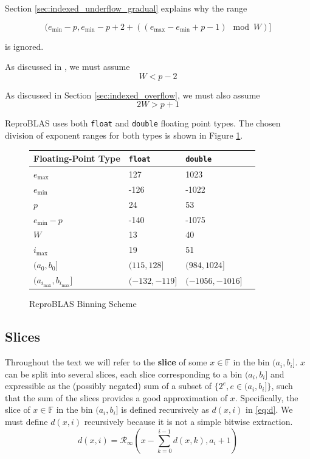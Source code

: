 \documentclass[12pt]{article}
\providecommand{\F}{\ensuremath{\mathbb{F}}}
\providecommand{\min}{\ensuremath{\text{min}}}
\providecommand{\max}{\ensuremath{\text{max}}}
\providecommand{\roundtonearestinfty}{\ensuremath{\mathcal{R}_\text{$\infty$}}}
\theoremstyle{definition}
\numberwithin{equation}{section}
\numberwithin{figure}{section}
\begin{document}
    Section \ref{sec:indexed_underflow_gradual} explains why the range

    \begin{equation*}
    (e_{\min} - p, e_{\min} - p + 2 + ((e_{\max} - e_{\min} + p - 1) \mod W)]
    \end{equation*}

    is ignored.

    As discussed in \cite{repsum}, we must assume
    \begin{equation}
      W < p - 2
      \label{eq:wupper}
    \end{equation}

    As discussed in Section \ref{sec:indexed_overflow}, we must also assume
    \begin{equation}
      2 W > p + 1
      \label{eq:wlower}
    \end{equation}

    ReproBLAS uses both \texttt{float} and \texttt{double} floating point types. The chosen division of exponent ranges for both types is shown in Figure \ref{fig:bins}.
    \begin{figure}[H] \centering\begin{tabular}{ | l | l | l | p{5cm} |} \hline Floating-Point Type & \texttt{float} & \texttt{double}\\ \hline $e_{\max}$ & 127 & 1023\\ \hline $e_{\min}$ &  -126 & -1022 \\ \hline $p$ & 24 & 53 \\ \hline $e_{\min} - p$ & -140 & -1075 \\ \hline $W$ & 13 & 40 \\ \hline $i_{\max}$ & 19 & 51 \\ \hline $(a_0, b_0]$ & $(115, 128]$ & $(984, 1024]$\\ \hline $(a_{i_{\max}}, b_{i_{\max}}]$ & $(-132, -119]$ & $(-1056, -1016]$ \\ \hline\end{tabular} \caption{ReproBLAS Binning Scheme}\label{fig:bins}\end{figure}

  \subsection{Slices}
    \label{sec:binning_slices}
    Throughout the text we will refer to the \textbf{slice} of some $x \in \F$ in the bin $(a_i, b_i]$. $x$ can be split into several slices, each slice corresponding to a bin $(a_i, b_i]$ and expressible as the (possibly negated) sum of a subset of $\{2^e, e \in (a_i, b_i]\}$, such that the sum of the slices provides a good approximation of $x$. Specifically, the slice of $x \in \F$ in the bin $(a_i, b_i]$ is defined recursively as $d(x, i)$ in \eqref{eq:d}. We must define $d(x, i)$ recursively because it is not a simple bitwise extraction.
    \begin{equation}
      d(x, i) = \roundtonearestinfty(x - \sum\limits_{k=0}^{i - 1}d(x,k), a_i + 1)
      \label{eq:d}
    \end{equation}
\end{document}
